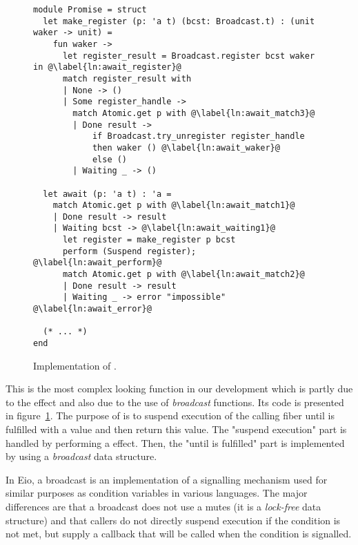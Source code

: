 \begin{figure}[ht]
  \begin{verbatim}
module Promise = struct
  let make_register (p: 'a t) (bcst: Broadcast.t) : (unit waker -> unit) = 
    fun waker ->
      let register_result = Broadcast.register bcst waker in @\label{ln:await_register}@
      match register_result with
      | None -> ()
      | Some register_handle ->
        match Atomic.get p with @\label{ln:await_match3}@
        | Done result ->  
            if Broadcast.try_unregister register_handle
            then waker () @\label{ln:await_waker}@
            else ()
        | Waiting _ -> ()

  let await (p: 'a t) : 'a = 
    match Atomic.get p with @\label{ln:await_match1}@
    | Done result -> result
    | Waiting bcst -> @\label{ln:await_waiting1}@
      let register = make_register p bcst
      perform (Suspend register); @\label{ln:await_perform}@
      match Atomic.get p with @\label{ln:await_match2}@
      | Done result -> result 
      | Waiting _ -> error "impossible" @\label{ln:await_error}@
    
  (* ... *)
end
  \end{verbatim}
  \caption{Implementation of .}
  \label{fig:sched-impl-await}
\end{figure}

This is the most complex looking function in our development which is partly due to the \esuspend{} effect and also due to the use of \emph{broadcast} functions.
Its code is presented in figure~\ref{fig:sched-impl-await}.
The purpose of  is to suspend execution of the calling fiber until  is fulfilled with a value and then return this value.
The "suspend execution" part is handled by performing a \esuspend{} effect.
Then, the "until  is fulfilled" part is implemented by using a \emph{broadcast} data structure.

In Eio, a broadcast is an implementation of a signalling mechanism used for similar purposes as condition variables in various languages.
The major differences are that a broadcast does not use a mutes (it is a \emph{lock-free} data structure) and that callers do not directly suspend execution if the condition is not met, but supply a callback that will be called when the condition is signalled.

